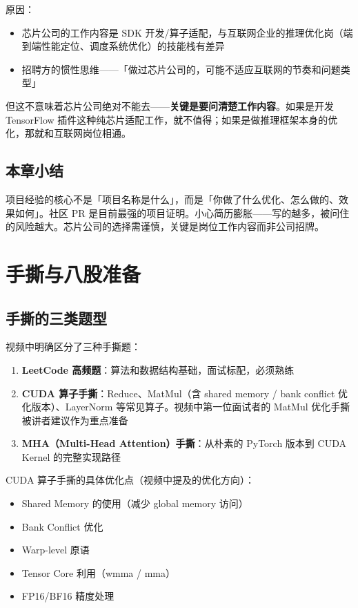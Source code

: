 \documentclass[a4paper]{article}
\begin{document}
原因：
\begin{itemize}
  \item 芯片公司的工作内容是 SDK 开发/算子适配，与互联网企业的推理优化岗（端到端性能定位、调度系统优化）的技能栈有差异
  \item 招聘方的惯性思维——「做过芯片公司的，可能不适应互联网的节奏和问题类型」
\end{itemize}

但这不意味着芯片公司绝对不能去——\textbf{关键是要问清楚工作内容}。如果是开发 TensorFlow 插件这种纯芯片适配工作，就不值得；如果是做推理框架本身的优化，那就和互联网岗位相通。

\subsection{本章小结}

项目经验的核心不是「项目名称是什么」，而是「你做了什么优化、怎么做的、效果如何」。社区 PR 是目前最强的项目证明。小心简历膨胀——写的越多，被问住的风险越大。芯片公司的选择需谨慎，关键是岗位工作内容而非公司招牌。

\section{手撕与八股准备}

\subsection{手撕的三类题型}

视频中明确区分了三种手撕题：

\begin{enumerate}
  \item \textbf{LeetCode 高频题}：算法和数据结构基础，面试标配，必须熟练
  \item \textbf{CUDA 算子手撕}：Reduce、MatMul（含 shared memory / bank conflict 优化版本）、LayerNorm 等常见算子。视频中第一位面试者的 MatMul 优化手撕被讲者建议作为重点准备
  \item \textbf{MHA（Multi-Head Attention）手撕}：从朴素的 PyTorch 版本到 CUDA Kernel 的完整实现路径
\end{enumerate}

CUDA 算子手撕的具体优化点（视频中提及的优化方向）：
\begin{itemize}
  \item Shared Memory 的使用（减少 global memory 访问）
  \item Bank Conflict 优化
  \item Warp-level 原语
  \item Tensor Core 利用（wmma / mma）
  \item FP16/BF16 精度处理
\end{itemize}
\end{document}
